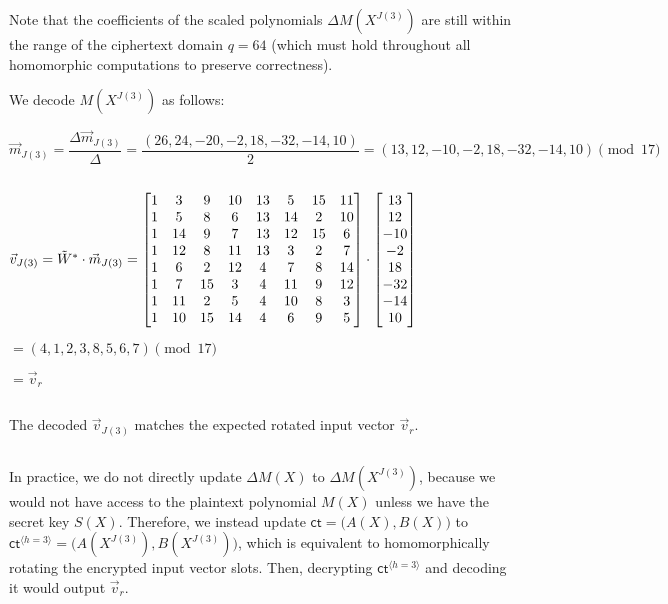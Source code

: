 $ $

Note that the coefficients of the scaled polynomials $\Delta M(X^{J(3)})$ are still within the range of the ciphertext domain $q=64$ (which must hold throughout all homomorphic computations to preserve correctness). 

We decode $M(X^{J(3)})$ as follows: 

$\vec{m}_{J(3)} = \dfrac{\Delta \vec{m}_{J(3)}}{\Delta} = \dfrac{(26, 24, -20, -2, 18, -32, -14, 10)}{2} = (13, 12, -10, -2, 18, -32, -14, 10) \pmod{17}$

$ $


$\vec{v}_{J(3)} = \tilde{W}^* \cdot \vec{m}_{J(3)} = \begin{bmatrix}
1&3&9&10&13&5&15&11\\
1&5&8&6&13&14&2&10\\
1&14&9&7&13&12&15&6\\
1&12&8&11&13&3&2&7\\
1&6&2&12&4&7&8&14\\
1&7&15&3&4&11&9&12\\
1&11&2&5&4&10&8&3\\
1&10&15&14&4&6&9&5\\
\end{bmatrix} \cdot \begin{bmatrix}
13\\
12\\
-10\\
-2\\
18\\
-32\\
-14\\
10\end{bmatrix}$

$= (4, 1, 2, 3, 8, 5, 6, 7) \pmod{17}$

$= \vec{v}_r$

$ $

The decoded $\vec{v}_{J(3)}$ matches the expected rotated input vector $\vec{v}_r$.  


$ $

In practice, we do not directly update $\Delta M(X)$ to $\Delta M(X^{J(3)})$, because we would not have access to the plaintext polynomial $M(X)$ unless we have the secret key $S(X)$. Therefore, we instead update $\textsf{ct}=\bm(A(X), B(X)\bm)$ to $\textsf{ct}^{\langle h=3 \rangle}=\bm(A(X^{J(3)}), B(X^{J(3)})\bm)$, which is equivalent to homomorphically rotating the encrypted input vector slots. Then, decrypting $\textsf{ct}^{\langle h=3 \rangle}$ and decoding it would output $\vec{v}_r$.

